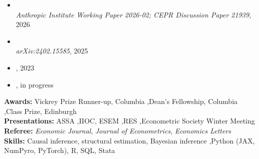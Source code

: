 \documentclass[letterpaper,10pt]{article}
\begin{document}


\begin{itemize}
\item \href{https://cepr.org/publications/dp21939}{} \\
\textit{Anthropic Institute Working Paper 2026-02; CEPR Discussion Paper 21939}, 2026

\item \href{https://arxiv.org/abs/2402.15585}{} \\
\textit{arXiv:2402.15585}, 2025

\item {}, 2023

\item {} , in progress
\end{itemize}



\noindent\textbf{Awards:} Vickrey Prize Runner-up, Columbia  \sep Dean's Fellowship, Columbia  \sep Class Prize, Edinburgh \\[3pt]
\textbf{Presentations:} ASSA  \sep IIOC, ESEM  \sep RES  \sep Econometric Society Winter Meeting \\[3pt]
\textbf{Referee:} \textit{Economic Journal}, \textit{Journal of Econometrics}, \textit{Economics Letters}\\[3pt]
\textbf{Skills:} Causal inference, structural estimation, Bayesian inference \sep Python (JAX, NumPyro, PyTorch), R, SQL, Stata
\end{document}
